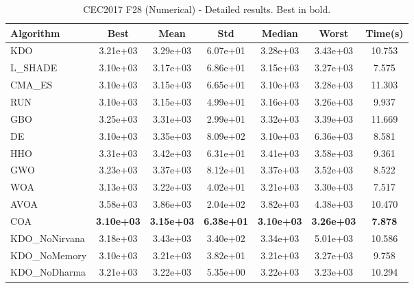 \begin{table}[H]
\centering\small
\caption{CEC2017 F28 (Numerical) - Detailed results. Best in bold.}
\label{tab:cec2017_F28}
\begin{tabular}{lcccccc}
\toprule
\textbf{Algorithm} & \textbf{Best} & \textbf{Mean} & \textbf{Std} & \textbf{Median} & \textbf{Worst} & \textbf{Time(s)} \\
\midrule
KDO & 3.21e+03 & 3.29e+03 & 6.07e+01 & 3.28e+03 & 3.43e+03 & 10.753 \\
L_SHADE & 3.10e+03 & 3.17e+03 & 6.86e+01 & 3.15e+03 & 3.27e+03 & 7.575 \\
CMA_ES & 3.10e+03 & 3.15e+03 & 6.65e+01 & 3.10e+03 & 3.28e+03 & 11.303 \\
RUN & 3.10e+03 & 3.15e+03 & 4.99e+01 & 3.16e+03 & 3.26e+03 & 9.937 \\
GBO & 3.25e+03 & 3.31e+03 & 2.99e+01 & 3.32e+03 & 3.39e+03 & 11.669 \\
DE & 3.10e+03 & 3.35e+03 & 8.09e+02 & 3.10e+03 & 6.36e+03 & 8.581 \\
HHO & 3.31e+03 & 3.42e+03 & 6.31e+01 & 3.41e+03 & 3.58e+03 & 9.361 \\
GWO & 3.23e+03 & 3.37e+03 & 8.12e+01 & 3.37e+03 & 3.52e+03 & 8.522 \\
WOA & 3.13e+03 & 3.22e+03 & 4.02e+01 & 3.21e+03 & 3.30e+03 & 7.517 \\
AVOA & 3.58e+03 & 3.86e+03 & 2.04e+02 & 3.82e+03 & 4.38e+03 & 10.470 \\
COA & \textbf{3.10e+03} & \textbf{3.15e+03} & \textbf{6.38e+01} & \textbf{3.10e+03} & \textbf{3.26e+03} & \textbf{7.878} \\
KDO_NoNirvana & 3.18e+03 & 3.43e+03 & 3.40e+02 & 3.34e+03 & 5.01e+03 & 10.586 \\
KDO_NoMemory & 3.10e+03 & 3.21e+03 & 3.82e+01 & 3.21e+03 & 3.27e+03 & 9.758 \\
KDO_NoDharma & 3.21e+03 & 3.22e+03 & 5.35e+00 & 3.22e+03 & 3.23e+03 & 10.294 \\
\bottomrule
\end{tabular}
\end{table}
